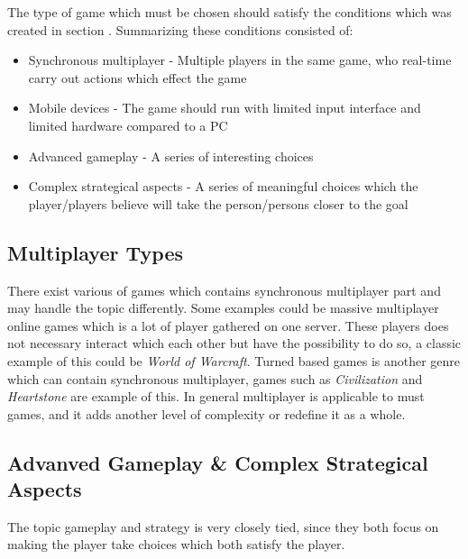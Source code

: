 The type of game which must be chosen should satisfy the conditions which was created in section \cite{sec:specifyingtheproblemstatement}.
Summarizing these conditions consisted of:
\begin{itemize}
\item Synchronous multiplayer - Multiple players in the same game, who real-time carry out actions which effect the game
\item Mobile devices - The game should run with limited input interface and limited hardware compared to a PC
\item Advanced gameplay - A series of interesting choices
\item Complex strategical aspects - A series of meaningful choices which the player/players believe will take the person/persons closer to the goal
\end{itemize}

\subsection{Multiplayer Types}
There exist various of games which contains synchronous multiplayer part and may handle the topic differently. Some examples could be massive multiplayer online games which is a lot of player gathered on one server. These players does not necessary interact which each other but have the possibility to do so, a classic example of this could be \textit{World of Warcraft}. Turned based games is another genre which can contain synchronous multiplayer, games such as \textit{Civilization} and \textit{Heartstone} are example of this. In general multiplayer is applicable to must games, and it adds another level of complexity or redefine it as a whole.

\subsection{Advanved Gameplay \& Complex Strategical Aspects}
The topic gameplay and strategy is very closely tied, since they both focus on making the player take choices which both satisfy the player.

